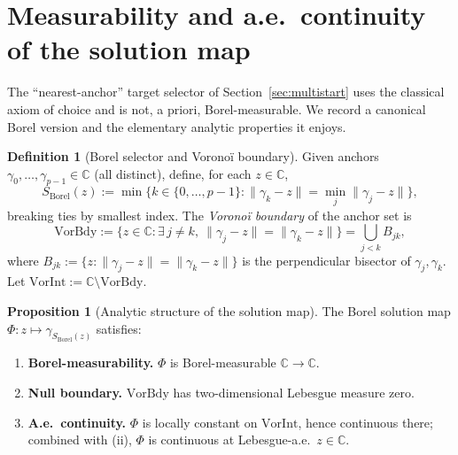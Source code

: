 \documentclass[11pt,a4paper]{article}
\theoremstyle{definition}
\newtheorem{definition}{Definition}[section]
\newtheorem{proposition}{Proposition}[section]
\begin{document}
\section{Measurability and a.e.\ continuity of the solution map}
\label{sec:measurability}

The ``nearest-anchor'' target selector of Section~\ref{sec:multistart} uses the classical axiom of choice and is not, a priori, Borel-measurable. We record a canonical Borel version and the elementary analytic properties it enjoys.

\begin{definition}[Borel selector and Voronoï boundary]\label{def:borel-selector}
Given anchors $\gamma_0, \dots, \gamma_{p-1} \in \mathbb{C}$ (all distinct), define, for each $z \in \mathbb{C}$,
\[
  S_{\mathrm{Borel}}(z) := \min\bigl\{k \in \{0, \dots, p-1\} : \|\gamma_k - z\| = \min_{j} \|\gamma_j - z\|\bigr\},
\]
breaking ties by smallest index. The \emph{Voronoï boundary} of the anchor set is
\[
  \mathrm{VorBdy} := \bigl\{z \in \mathbb{C} : \exists\, j \neq k,\ \|\gamma_j - z\| = \|\gamma_k - z\|\bigr\}
  = \bigcup_{j < k} B_{jk},
\]
where $B_{jk} := \{z : \|\gamma_j - z\| = \|\gamma_k - z\|\}$ is the perpendicular bisector of $\gamma_j, \gamma_k$. Let $\mathrm{VorInt} := \mathbb{C} \setminus \mathrm{VorBdy}$.
\end{definition}

\begin{proposition}[Analytic structure of the solution map]
\label{thm:borel-combined}
The Borel solution map $\Phi : z \mapsto \gamma_{S_{\mathrm{Borel}}(z)}$ satisfies:
\begin{enumerate}
  \item[(i)] \textbf{Borel-measurability.} $\Phi$ is Borel-measurable $\mathbb{C} \to \mathbb{C}$.
  \item[(ii)] \textbf{Null boundary.} $\mathrm{VorBdy}$ has two-dimensional Lebesgue measure zero.
  \item[(iii)] \textbf{A.e.\ continuity.} $\Phi$ is locally constant on $\mathrm{VorInt}$, hence continuous there; combined with (ii), $\Phi$ is continuous at Lebesgue-a.e.\ $z \in \mathbb{C}$.
\end{enumerate}
\end{proposition}
\end{document}
